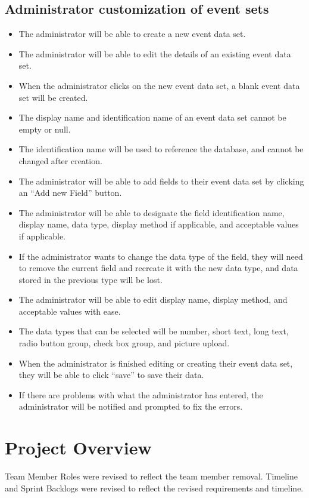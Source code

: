 \subsection{Administrator customization of event sets}
\begin{itemize}
\item The administrator will be able to create a new event data set.
\item The administrator will be able to edit the details of an existing event data set.
\item When the administrator clicks on the new event data set, a blank event data set will be created. 
\item The display name and identification name of an event data set cannot be empty or null.
\item The identification name will be used to reference the database, and cannot be changed after creation.
\item The administrator will be able to add fields to their event data set by clicking an ``Add new Field'' button.
\item The administrator will be able to designate the field identification name, display name, data type, display method if applicable, and acceptable values if applicable. 
\item If the administrator wants to change the data type of the field, they will need to remove the current field and recreate it with the new data type, and data stored in the previous type will be lost.
\item The administrator will be able to edit display name, display method, and acceptable values with ease.
\item The data types that can be selected will be number, short text, long text, radio button group, check box group, and picture upload.
\item When the administrator is finished editing or creating their event data set, they will be able to click ``save'' to save their data. 
\item If there are problems with what the administrator has entered, the administrator will be notified and prompted to fix the errors.
\end{itemize}

\section{Project Overview}
Team Member Roles were revised to reflect the team member removal. Timeline and Sprint Backlogs were revised to reflect the revised requirements and timeline.
